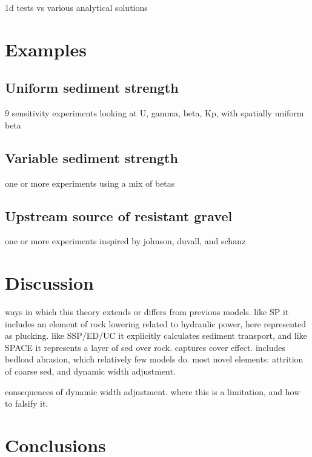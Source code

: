 \documentclass[journal abbreviation, manuscript]{copernicus}
\begin{document}
1d tests vs various analytical solutions

\section{Examples}

\subsection{Uniform sediment strength}

9 sensitivity experiments looking at U, gamma, beta, Kp, with spatially uniform beta

\subsection{Variable sediment strength}

one or more experiments using a mix of betas

\subsection{Upstream source of resistant gravel}

one or more experiments inspired by johnson, duvall, and schanz

\section{Discussion}

ways in which this theory extends or differs from previous models. like SP it includes an element of rock lowering related to hydraulic power, here represented as plucking. like SSP/ED/UC it explicitly calculates sediment transport, and like SPACE it represents a layer of sed over rock. captures cover effect. includes bedload abrasion, which relatively few models do. most novel elements: attrition of coarse sed, and dynamic width adjustment.

consequences of dynamic width adjustment. where this is a limitation, and how to falsify it.




\section{Conclusions}




\codeavailability
\end{document}
